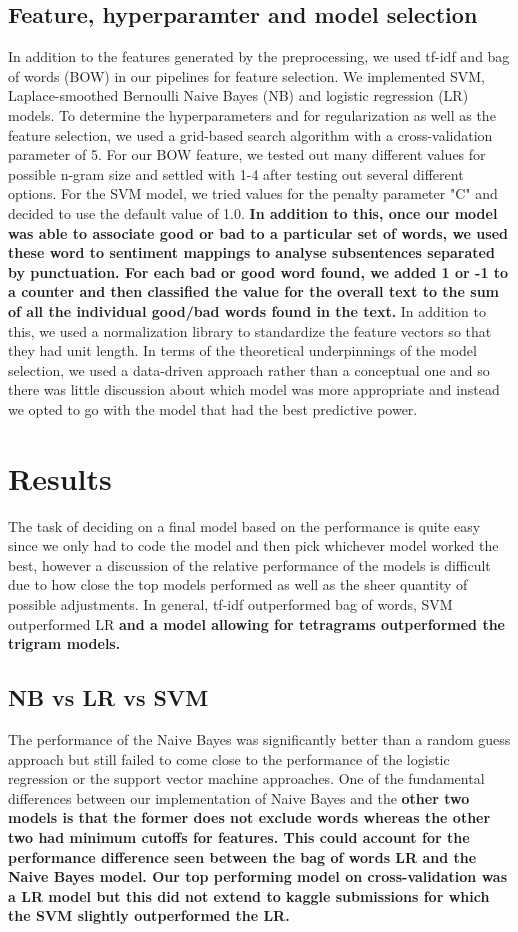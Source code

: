 \documentclass{amsart}
\theoremstyle{definition}
\theoremstyle{remark}
\numberwithin{equation}{section}
\begin{document}
\subsection{Feature, hyperparamter and model selection}
In addition to the features generated by the preprocessing, we used tf-idf and bag of words (BOW) in our pipelines for feature selection.  We implemented SVM, Laplace-smoothed Bernoulli Naive Bayes (NB) and logistic regression (LR) models.  To determine the hyperparameters and for regularization as well as the feature selection, we used a grid-based search algorithm with a cross-validation parameter of 5.  For our BOW feature, we tested out many different values for possible n-gram size and settled with 1-4 after testing out several different options.  For the SVM model, we tried values for the penalty parameter "C" and decided to use the default value of 1.0.  \textbf{In addition to this, once our model was able to associate good or bad to a particular set of words, we used these word to sentiment mappings to analyse subsentences separated by punctuation.  For each bad or good word found, we added 1 or -1 to a counter and then classified the value for the overall text to the sum of all the individual good/bad words found in the text.}  In addition to this, we used a normalization library to standardize the feature vectors so that they had unit length.  In terms of the theoretical underpinnings of the model selection, we used a data-driven approach rather than a conceptual one and so there was little discussion about which model was more appropriate and instead we opted to go with the model that had the best predictive power.
\section{Results}
The task of deciding on a final model based on the performance is quite easy since we only had to code the model and then pick whichever model worked the best, however a discussion of the relative performance of the models is difficult due to how close the top models performed as well as the sheer quantity of possible adjustments.  In general, tf-idf outperformed bag of words, SVM outperformed LR \textbf{and a model allowing for tetragrams outperformed the trigram models.}
\subsection{NB vs LR vs SVM}
The performance of the Naive Bayes was significantly better than a random guess approach but still failed to come close to the performance of the logistic regression or the support vector machine approaches.  One of the fundamental differences between our implementation of Naive Bayes and the \textbf{other two models is that the former does not exclude words whereas the other two had minimum cutoffs for features.  This could account for the performance difference seen between the bag of words LR and the Naive Bayes model.  Our top performing model on cross-validation was a LR model but this did not extend to kaggle submissions for which the SVM slightly outperformed the LR.}
\end{document}
